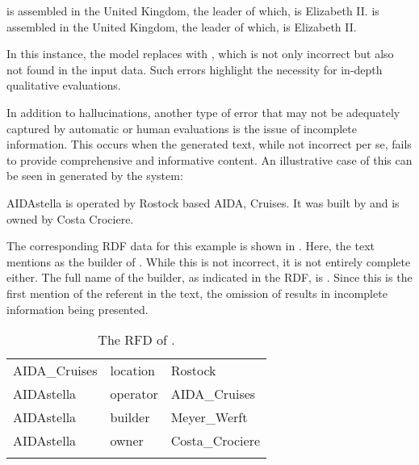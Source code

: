 \begin{exe}
	\ex\label{ex:aston}
	\begin{xlist}
		\ex\label{ex:aston1}   is assembled in the United Kingdom, the leader of which, is Elizabeth II.
		\ex\label{ex:aston2}    is assembled in the United Kingdom, the leader of which, is Elizabeth II.
	\end{xlist}
\end{exe}

In this instance, the model replaces  with , which is not only incorrect but also not found in the input data. Such errors highlight the necessity for in-depth qualitative evaluations. 

In addition to hallucinations, another type of error that may not be adequately captured by automatic or human evaluations is the issue of incomplete information. This occurs when the generated text, while not incorrect per se, fails to provide comprehensive and informative content. An illustrative case of this can be seen in  generated by the  system:

\begin{exe}
	\ex\label{ex:aidastella_attmeta} AIDAstella is operated by Rostock based AIDA, Cruises. It was built by  and is owned by Costa Crociere.
\end{exe}

The corresponding RDF data for this example is shown in . Here, the text mentions  as the builder of . While this is not incorrect, it is not entirely complete either. The full name of the builder, as indicated in the RDF, is . Since this is the first mention of the referent  in the text, the omission of  results in incomplete information being presented.

\begin{table}
	\begin{tabular}{lll}
		\lsptoprule
		AIDA\_Cruises & location & Rostock \\
		AIDAstella & operator & AIDA\_Cruises \\
		AIDAstella & builder & Meyer\_Werft \\
		AIDAstella & owner & Costa\_Crociere \\
	   \lspbottomrule
	\end{tabular}
	\caption{The RFD of .}\label{tab:aidastella_attmeta}
\end{table}

